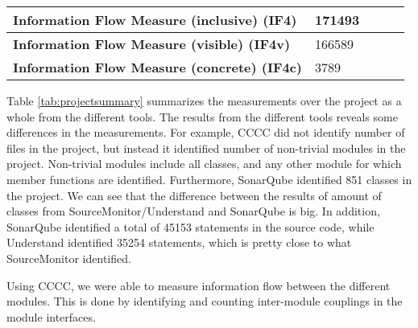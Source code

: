 \begin{table}[]
\begin{tabular}{|l|l|l|l|l|}
\textbf{Information Flow Measure (inclusive) (IF4)} & 171493        &                    &                                          &                        \\ \hline
\textbf{Information Flow Measure (visible) (IF4v)}  & 166589        &                    &                                          &                        \\ \hline
\textbf{Information Flow Measure (concrete) (IF4c)} & 3789          &                    &                                          &                        \\ \hline
\end{tabular}
\end{table}


Table \ref{tab:projectsummary} summarizes the measurements over the project as a whole from the different tools. The results from the different tools reveals some differences in the measurements. For example, CCCC did not identify number of files in the project, but instead it identified number of non-trivial modules in the project. Non-trivial modules include all classes, and any other module for which member functions are identified. Furthermore, SonarQube identified 851 classes in the project. We can see that the difference between the results of amount of classes from SourceMonitor/Understand and SonarQube is big. In addition, SonarQube identified a total of 45153 statements in the source code, while Understand identified 35254 statements, which is pretty close to what SourceMonitor identified. 

Using CCCC, we were able to measure information flow between the different modules. This is done by identifying and counting inter-module couplings in the module interfaces. 





